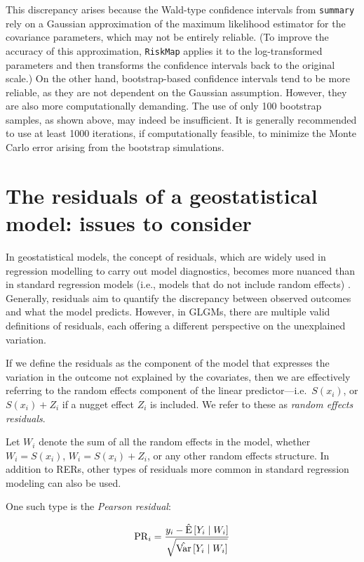 \documentclass[
  letterpaper,
]{krantz}
\begin{document}
This discrepancy arises because the Wald-type confidence intervals from
\texttt{summary} rely on a Gaussian approximation of the maximum
likelihood estimator for the covariance parameters, which may not be
entirely reliable. (To improve the accuracy of this approximation,
\texttt{RiskMap} applies it to the log-transformed parameters and then
transforms the confidence intervals back to the original scale.) On the
other hand, bootstrap-based confidence intervals tend to be more
reliable, as they are not dependent on the Gaussian assumption. However,
they are also more computationally demanding. The use of only 100
bootstrap samples, as shown above, may indeed be insufficient. It is
generally recommended to use at least 1000 iterations, if
computationally feasible, to minimize the Monte Carlo error arising from
the bootstrap simulations.

\section{The residuals of a geostatistical model: issues to
consider}\label{the-residuals-of-a-geostatistical-model-issues-to-consider}

In geostatistical models, the concept of residuals, which are widely
used in regression modelling to carry out model diagnostics, becomes
more nuanced than in standard regression models (i.e., models that do
not include random effects) . Generally, residuals aim to quantify the
discrepancy between observed outcomes and what the model predicts.
However, in GLGMs, there are multiple valid definitions of residuals,
each offering a different perspective on the unexplained variation.

If we define the residuals as the component of the model that expresses
the variation in the outcome not explained by the covariates, then we
are effectively referring to the random effects component of the linear
predictor---i.e.~\(S(x_i)\), or \(S(x_i) + Z_i\) if a nugget effect
\(Z_i\) is included. We refer to these as \emph{random effects
residuals}.

Let \(W_i\) denote the sum of all the random effects in the model,
whether \(W_i = S(x_i)\), \(W_i = S(x_i) + Z_i\), or any other random
effects structure. In addition to RERs, other types of residuals more
common in standard regression modeling can also be used.

One such type is the \emph{Pearson residual}:

\[
{\rm PR}_i = \frac{y_i - \hat{\text{E}}\left[Y_i \mid W_i\right]}{\sqrt{\hat{\text{Var}}\left[Y_i \mid W_i\right]}}
\]
\end{document}
